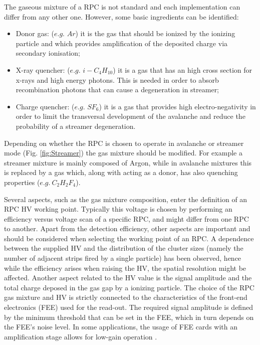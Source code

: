 The gaseous mixture of a RPC is not standard and each implementation can differ from any other one.
However, some basic ingredients can be identified:
\begin{itemize}
\item Donor gas: ($e.g.$ $Ar$) it is the gas that should be ionized by the ionizing particle and which provides amplification of the deposited charge via secondary ionisation;
\item X-ray quencher: ($e.g.$ $i-C_4H_{10}$) it is a gas that has an high cross section for x-rays and high energy photons. This is needed in order to absorb recombination photons that can cause a degeneration in streamer;
\item Charge quencher: ($e.g.$ $SF_6$) it is a gas that provides high electro-negativity in order to limit the transversal development of the avalanche and reduce the probability of a streamer degeneration.
\end{itemize}

Depending on whether the RPC is chosen to operate in avalanche or streamer mode (Fig. \ref{fig:Streamer}) the gas mixture should be modified.
For example a streamer mixture is mainly composed of Argon, while in avalanche mixtures this is replaced by a gas which, along with acting as a donor, has also quenching properties ($e.g.\ C_2H_2F_4$).

Several aspects, such as the gas mixture composition, enter the definition of an RPC HV working point.
Typically this voltage is chosen by performing an efficiency versus voltage scan of a specific RPC, and might differ from one RPC to another.
Apart from the detection efficiency, other aspects are important and should be considered when selecting the working point of an RPC.
A dependence between the supplied HV and the distribution of the cluster sizes (namely the number of adjacent strips fired by a single particle) has been observed, hence while the efficiency arises when raising the HV, the spatial resolution might be affected.
Another aspect related to the HV value is the signal amplitude and the total charge deposed in the gas gap by a ionizing particle.
The choice  of the RPC gas mixture and HV is strictly connected to the characteristics of the front-end electronics (FEE) used for the read-out. 
The required signal amplitude is defined by the minimum threshold that can be set in the FEE, which in turn depends on the FEE’s noise level. 
In some applications, the usage of FEE cards with an amplification stage allows for low-gain operation \cite{Marchisone:2017bcb}.

